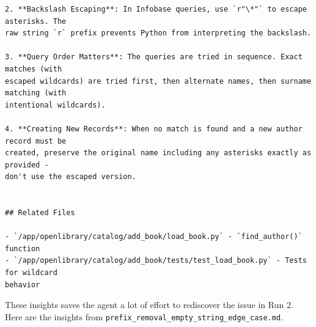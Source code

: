 \begin{tcolorbox}
\begin{verbatim}
2. **Backslash Escaping**: In Infobase queries, use `r"\*"` to escape asterisks. The
raw string `r` prefix prevents Python from interpreting the backslash.

3. **Query Order Matters**: The queries are tried in sequence. Exact matches (with
escaped wildcards) are tried first, then alternate names, then surname matching (with
intentional wildcards).

4. **Creating New Records**: When no match is found and a new author record must be
created, preserve the original name including any asterisks exactly as provided - 
don't use the escaped version.


## Related Files

- `/app/openlibrary/catalog/add_book/load_book.py` - `find_author()` function
- `/app/openlibrary/catalog/add_book/tests/test_load_book.py` - Tests for wildcard
behavior
\end{verbatim}
\end{tcolorbox}
These insights saves the agent a lot of effort to rediscover the issue in Run 2. 
Here are the insights from \texttt{prefix\_removal\_empty\_string\_edge\_case.md}.

